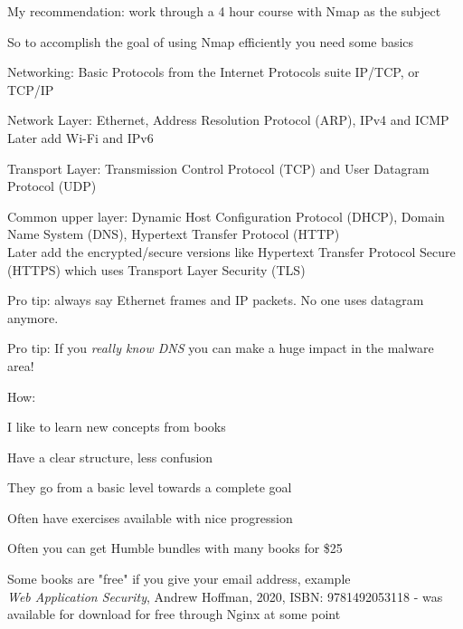 \documentclass[Screen16to9,17pt]{foils}
\begin{document}
My recommendation: work through a 4 hour course with Nmap as the subject






So to accomplish the goal of using Nmap efficiently you need some basics

Networking: Basic Protocols from the Internet Protocols suite IP/TCP, or TCP/IP
\begin{list2}
\item Network Layer: Ethernet, Address Resolution Protocol (ARP), IPv4 and ICMP\\
Later add Wi-Fi and IPv6
\item Transport Layer: Transmission Control Protocol (TCP) and User Datagram Protocol (UDP)
\item Common upper layer: Dynamic Host Configuration Protocol (DHCP), Domain Name System (DNS),
Hypertext Transfer Protocol (HTTP)\\
Later add the encrypted/secure versions like Hypertext Transfer Protocol Secure (HTTPS) which uses Transport Layer Security (TLS)
\end{list2}

Pro tip: always say Ethernet frames and IP packets. No one uses datagram anymore.

Pro tip: If you \emph{really know DNS} you can make a huge impact in the malware area!



How:

I like to learn new concepts from books
\begin{list2}
\item Have a clear structure, less confusion
\item They go from a basic level towards a complete goal
\item Often have exercises available with nice progression
\item Often you can get Humble bundles with many books for \$25
\item Some books are "free" if you give your email address, example\\
\emph{Web Application Security}, Andrew Hoffman, 2020, ISBN: 9781492053118 - was available for download for free through Nginx at some point
\end{list2}
\end{document}
